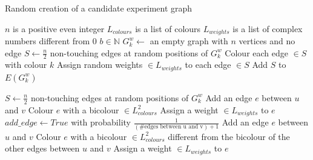 \begin{enumerate}
\begin{definition}
            \begin{algorithm}
                \caption{Random creation of a candidate experiment graph}
                \label{alg:random_creation_candidate_experiment_graph}
                \begin{algorithmic}
                    \Require $n$ is a positive even integer
                    \Require $L_{colours}$ is a list of colours
                    \Require $L_{weights}$ is a list of complex numbers different from 0
                    \Require $b \in \mathbb{N}$
                    \State $G_k^w \gets$ an empty graph with $n$ vertices and no edge
                        \State $S \gets \frac{n}{2}$ non-touching edges at random positions of $G_k^w$
                        \State Colour each edge $\in S$ with colour $k$
                        \State Assign random weights $\in L_{weights}$ to each edge $\in S$
                        \State Add $S$ to $E(G_k^w)$
                    \EndFor

                        \State $S \gets \frac{n}{2}$ non-touching edges at random positions of $G_k^w$
                                \State Add an edge $e$ between $u$ and $v$
                                \State Colour $e$ with a bicolour $\in L_{colours}^2$
                                \State Assign a weight $\in L_{weights}$ to $e$
                            \Else
                                \State $add\_edge \gets True$ with probability $\frac{1}{(\mbox{\#edges between u and v}) + 1}$
                                    \State Add an edge $e$ between $u$ and $v$
                                    \State Colour $e$ with a bicolour $\in L_{colours}^2$ different from the bicolour of the other edges between $u$ and $v$
                                    \State Assign a weight $\in L_{weights}$ to $e$
                                \EndIf
                            \EndIf
                        \EndFor
                    \EndFor
                \end{algorithmic}
            \end{algorithm}
        \end{definition}


\end{enumerate}
